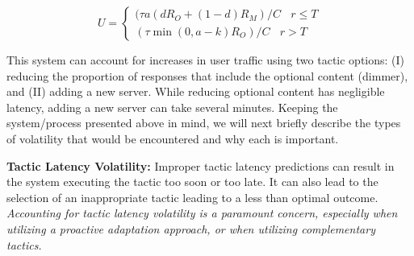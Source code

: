 \documentclass[12pt]{article}
\begin{document}
\begin{equation} \label{eq: motivatingExample}
	U = \left\{ \begin{array}{rl}
 	(\tau a (dR_O+(1-d)R_M)/C~~~~r\leq T \\ 
  	(\tau \min (0,a-k)R_O)/C~~~~r> T 
       \end{array} \right.
\end{equation}

This system can account for increases in user traffic using two tactic options: (I) reducing the proportion of responses that include the optional content (dimmer), and (II) adding a new server. While reducing optional content has negligible latency, adding a new server can take several minutes. Keeping the system/process presented above in mind, we will next briefly describe the types of volatility that would be encountered and why each is important. %

\vspace{1mm} \noindent \textbf{Tactic Latency Volatility: }%
Improper tactic latency predictions can result in the system executing the tactic too soon or too late. It can also lead to the selection of an inappropriate tactic leading to a less than optimal outcome. \emph{Accounting for tactic latency volatility is a paramount concern, especially when utilizing a proactive adaptation approach, or when utilizing complementary tactics.} 

\end{document}
